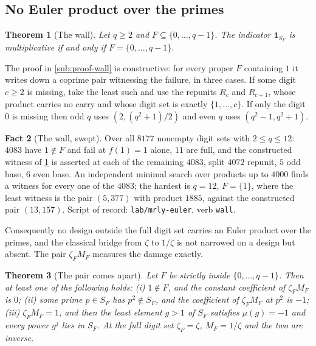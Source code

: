 \documentclass[11pt]{amsart}
\newtheorem{theorem}{Theorem}[section]
\theoremstyle{definition}
\newtheorem{fact}[theorem]{Fact}
\theoremstyle{remark}
\begin{document}
\subsection{No Euler product over the primes}
\label{sub:wall}

\begin{theorem}[The wall]
\label{thm:wall}
Let $q \ge 2$ and $F \subseteq \{0,\dots,q-1\}$. The indicator $\mathbf{1}_{S_{F}}$ is multiplicative if and only if $F = \{0,\dots,q-1\}$.
\end{theorem}

The proof in \cref{sub:proof-wall} is constructive: for every proper $F$ containing $1$ it writes down a coprime pair witnessing the failure, in three cases. If some digit $c \ge 2$ is missing, take the least such and use the repunits $R_{c}$ and $R_{c+1}$, whose product carries no carry and whose digit set is exactly $\{1,\dots,c\}$. If only the digit $0$ is missing then odd $q$ uses $(2, (q^{2}+1)/2)$ and even $q$ uses $(q^{2}-1, q^{2}+1)$.

\begin{fact}[The wall, swept]
\label{fact:wall}
Over all $8177$ nonempty digit sets with $2 \le q \le 12$: $4083$ have $1 \notin F$ and fail at $f(1) = 1$ alone, $11$ are full, and the constructed witness of \cref{thm:wall} is asserted at each of the remaining $4083$, split $4072$ repunit, $5$ odd base, $6$ even base. An independent minimal search over products up to $4000$ finds a witness for every one of the $4083$; the hardest is $q = 12$, $F = \{1\}$, where the least witness is the pair $(5, 377)$ with product $1885$, against the constructed pair $(13, 157)$. Script of record: \texttt{lab/mrly-euler}, verb \texttt{wall}.
\end{fact}

Consequently no design outside the full digit set carries an Euler product over the primes, and the classical bridge from $\zeta$ to $1/\zeta$ is not narrowed on a design but absent. The pair $\zeta_{F} M_{F}$ measures the damage exactly.

\begin{theorem}[The pair comes apart]
\label{thm:pair}
Let $F$ be strictly inside $\{0,\dots,q-1\}$. Then at least one of the following holds: (i) $1 \notin F$, and the constant coefficient of $\zeta_{F} M_{F}$ is $0$; (ii) some prime $p \in S_{F}$ has $p^{2} \notin S_{F}$, and the coefficient of $\zeta_{F} M_{F}$ at $p^{2}$ is $-1$; (iii) $\zeta_{F} M_{F} = 1$, and then the least element $g > 1$ of $S_{F}$ satisfies $\mu(g) = -1$ and every power $g^{j}$ lies in $S_{F}$. At the full digit set $\zeta_{F} = \zeta$, $M_{F} = 1/\zeta$ and the two are inverse.
\end{theorem}
\end{document}
